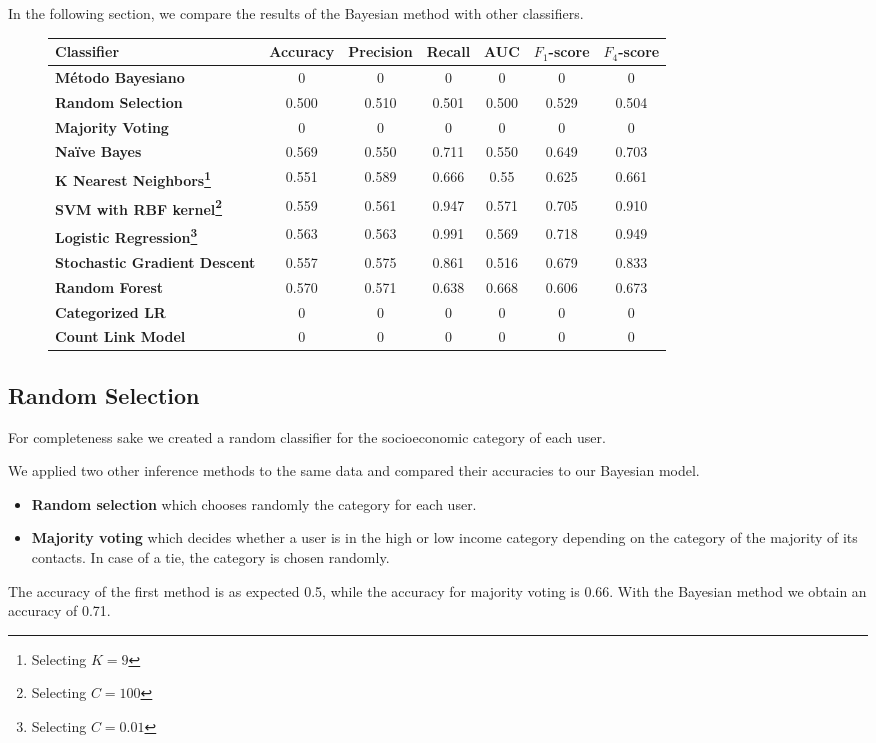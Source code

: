 In the following section, we compare the results of the Bayesian method with other classifiers.

\begin{figure}
	\begin{tabularx}{\textwidth}{>{\bfseries}X c c c c c c}
		\toprule
		\textbf{Classifier} & \textbf{Accuracy} & \textbf{Precision} & \textbf{Recall} & \textbf{AUC} & \textbf{$F_1$}-\textbf{score} & \textbf{$F_4$}-\textbf{score} \\
		\midrule
		Método Bayesiano & 0 & 0 & 0 & 0 & 0 & 0 \\
		\midrule
		Random Selection & 0.500 & 0.510 & 0.501 & 0.500 & 0.529 & 0.504 \\
		Majority Voting & 0 & 0 & 0 & 0 & 0 & 0 \\
		\midrule
		Naïve Bayes & 0.569 & 0.550 & 0.711 & 0.550 & 0.649 & 0.703 \\
		K Nearest Neighbors\footnote{Selecting $K = 9$} & 0.551 & 0.589 & 0.666 & 0.55 & 0.625 & 0.661 \\
		SVM with RBF kernel\footnote{Selecting $C = 100$} & 0.559 & 0.561 & 0.947 & 0.571 & 0.705 & 0.910 \\
		Logistic Regression\footnote{Selecting $C = 0.01$} & 0.563 & 0.563 & 0.991 & 0.569 & 0.718 & 0.949 \\
		Stochastic Gradient Descent & 0.557 & 0.575 & 0.861 & 0.516 & 0.679 & 0.833 \\
		Random Forest & 0.570 & 0.571 & 0.638 & 0.668 & 0.606 & 0.673 \\
		\midrule
		Categorized LR & 0 & 0 & 0 & 0 & 0 & 0 \\
		Count Link Model & 0 & 0 & 0 & 0 & 0 & 0 \\
		\bottomrule
	\end{tabularx}
\end{figure}

\subsection{Random Selection}

For completeness sake we created a random classifier for the socioeconomic category of each user.

We applied two other inference methods to the same data and compared their accuracies to our Bayesian model.

\begin{itemize}
	\item \textbf{Random selection} which chooses randomly the category for each user.
	\item \textbf{Majority voting} which decides whether a user is in the high or low income category depending on the category of the majority of its contacts. In case of a tie, the category is chosen randomly.
\end{itemize}

The accuracy of the first method is as expected \num{0.5}, while the accuracy for majority voting is \num{0.66}.
With the Bayesian method we obtain an accuracy of \num{0.71}.
